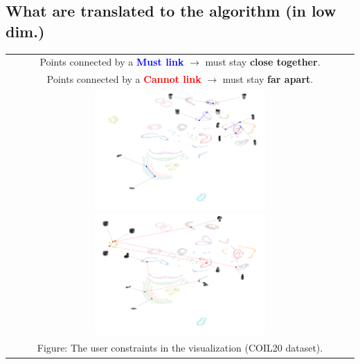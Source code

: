 \documentclass[portrait,final,a0paper]{nadiposter}
\begin{document}
\begin{poster}
{\begin{multicols}{2}
    \section*{\large{What are translated to the algorithm (in low dim.)}}
    \begin{center}
    \begin{tabular}{c}
        Points connected by a \textcolor{blue}{\textbf{Must link}} $\rightarrow$ must stay \textbf{close together}.\\
        Points connected by a \textcolor{red}{\textbf{Cannot link}} $\rightarrow$ must stay \textbf{far apart}.\\
        \includegraphics[height=12.5em]{poster_NADI_2018/images/example_constrains_COIL20_ML.pdf}
        \includegraphics[height=12.5em]{poster_NADI_2018/images/example_constrains_COIL20_CL.pdf}\\
        \tiny{Figure: The user constraints in the visualization (COIL20 dataset).}
    \end{tabular}
    \end{center}
\end{multicols}
}


\end{poster}
\end{document}
